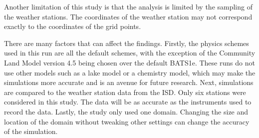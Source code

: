 	Another limitation of this study is that the analysis is limited by the sampling of the weather stations. The coordinates of the weather station may not correspond exactly to the coordinates of the grid points.
	
	There are many factors that can affect the findings. 
	Firstly, the physics schemes used in this run are all the default schemes, with the exception of the Community Land Model version 4.5 being chosen over the default BATS1e. 
	These runs do not use other models such as a lake model or a chemistry model, which may make the simulations more accurate and is an avenue for future research.
	Next, simulations are compared to the weather station data from the ISD.
	Only six stations were considered in this study.
	The data will be as accurate as the instruments used to record the data.
	Lastly, the study only used one domain.
	Changing the size and location of the domain without tweaking other settings can change the accuracy of the simulation.